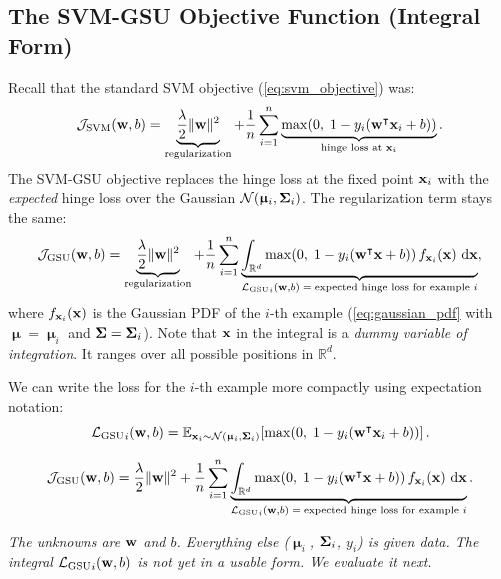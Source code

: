 \documentclass[11pt, letterpaper]{article}
\newcommand{\bSigma}{\vb{\Sigma}}
\newcommand{\bmu}{\boldsymbol{\upmu}}
\newcommand{\E}{\mathbb{E}}
\newcommand{\R}{\mathbb{R}}
\newcommand{\loss}{\mathcal{L}}
\newcommand{\obj}{\mathcal{J}}
\newcommand{\Norm}{\mathcal{N}}
\begin{document}
\subsection{The SVM-GSU Objective Function (Integral Form)}

Recall that the standard SVM objective (\cref{eq:svm_objective}) was:
\begin{equation*}
    \obj_{\text{SVM}}(\vb{w}, b) = \underbrace{\frac{\lambda}{2}\|\vb{w}\|^2}_{\text{regularization}} + \frac{1}{n}\sum_{i=1}^{n} \underbrace{\max\!\left(0,\; 1 - y_i\!\left(\vb{w}^{\intercal} \vb{x}_i + b\right)\right)}_{\text{hinge loss at } \vb{x}_i}.
\end{equation*}
The SVM-GSU objective replaces the hinge loss at the fixed point $\vb{x}_i$ with the \emph{expected} hinge loss over the Gaussian $\Norm(\bmu_i, \bSigma_i)$. The regularization term stays the same:
\begin{equation}\label{eq:gsu_objective}
    \obj_{\text{GSU}} (\vb{w}, b) = \underbrace{\frac{\lambda}{2}\|\vb{w}\|^2}_{\text{regularization}} + \frac{1}{n}\sum_{i=1}^{n} \underbrace{\int_{\R^d} \max\!\left(0,\; 1 - y_i\!\left(\vb{w}^{\intercal} \vb{x} + b\right)\right) f_{\vb{x}_i}(\vb{x})\, \dd{\vb{x}}}_{{\loss_{\text{GSU}}}_{i}(\vb{w}, b) \;=\; \text{expected hinge loss for example } i},
\end{equation}
where $f_{\vb{x}_i}(\vb{x})$ is the Gaussian PDF of the $i$-th example (\cref{eq:gaussian_pdf} with $\bmu = \bmu_i$ and $\bSigma = \bSigma_i$). Note that $\vb{x}$ in the integral is a \emph{dummy variable of integration}. It ranges over all possible positions in $\R^d$.

We can write the loss for the $i$-th example more compactly using expectation notation:
\begin{equation}\label{eq:gsu_loss_compact}
    {\loss_{\text{GSU}}}_{i}(\vb{w}, b) = \E_{\vb{x}_i \sim \Norm(\bmu_i, \bSigma_i)}\!\left[\max\!\left(0,\; 1 - y_i\!\left(\vb{w}^{\intercal} \vb{x}_i + b\right)\right)\right].
\end{equation}

\begin{statusbox}
\vspace{-0.5em}
\begin{equation*}
    \obj_{\text{GSU}} (\vb{w}, b) = \frac{\lambda}{2}\|\vb{w}\|^2 + \frac{1}{n}\sum_{i=1}^{n} \underbrace{\int_{\R^d} \max\!\left(0,\; 1 - y_i\!\left(\vb{w}^{\intercal} \vb{x} + b\right)\right) f_{\vb{x}_i}(\vb{x})\, \dd{\vb{x}}}_{{\loss_{\text{GSU}}}_{i}(\vb{w}, b) \;=\; \text{expected hinge loss for example } i}.
\end{equation*}
\vspace{-1em}
\begin{center}\small
\emph{The unknowns are $\vb{w}$ and $b$. Everything else ($\bmu_i$, $\bSigma_i$, $y_i$) is given data. The integral ${\loss_{\text{GSU}}}_{i}(\vb{w}, b)$ is not yet in a usable form. We evaluate it next.}
\end{center}
\end{statusbox}
\end{document}
